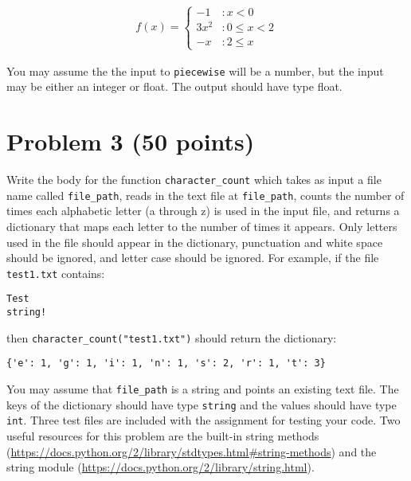 \documentclass[11pt]{article} %
\begin{document}
\begin{align*}
	f(x) = \left\{
	     \begin{array}{ll}
	       -1 & : x < 0\\
	       3x^2 & : 0 \leq x < 2\\
		   -x & : 2 \leq x
	     \end{array}
	   \right.
\end{align*}

You may assume the the input to \verb|piecewise| will be a number, but the input may be either an integer or float. The output should have type float.

\section*{Problem 3 (50 points)}

Write the body for the function \verb|character_count| which takes as input a file name called \verb|file_path|, reads in the text file at \verb|file_path|, counts the number of times each alphabetic letter (a through z) is used in the input file, and returns a dictionary that maps each letter to the number of times it appears. Only letters used in the file should appear in the dictionary, punctuation and white space should be ignored, and letter case should be ignored. For example, if the file \verb|test1.txt| contains:

\begin{verbatim}
Test 
string!
\end{verbatim}

then \verb|character_count("test1.txt")| should return the dictionary: 

\begin{verbatim}
{'e': 1, 'g': 1, 'i': 1, 'n': 1, 's': 2, 'r': 1, 't': 3}
\end{verbatim}

You may assume that \verb|file_path| is a string and points an existing text file. The keys of the dictionary should have type \verb|string| and the values should have type \verb|int|. Three test files are included with the assignment for testing your code. Two useful resources for this problem are the built-in string methods (\url{https://docs.python.org/2/library/stdtypes.html#string-methods}) and the string module (\url{https://docs.python.org/2/library/string.html}).
\end{document}
